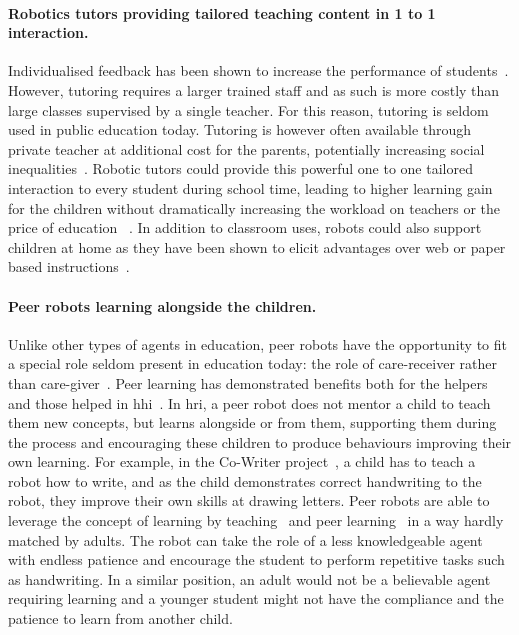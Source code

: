 \paragraph{Robotics tutors providing tailored teaching content in 1 to 1 interaction.} 
Individualised feedback has been shown to increase the performance of students~\citep{cohen1982educational,bloom19842}. However, tutoring requires a larger trained staff and as such is more costly than large classes supervised by a single teacher. For this reason, tutoring is seldom used in public education today. Tutoring is however often available through private teacher at additional cost for the parents, potentially increasing social inequalities~\citep{bray2009confronting}. Robotic tutors could provide this powerful one to one tailored interaction to every student during school time, leading to higher learning gain for the children without dramatically increasing the workload on teachers or the price of education ~\citep{kanda2004interactive,leyzberg2012physical,kennedy2016social,gordon2016affective}. In addition to classroom uses, robots could also support children at home as they have been shown to elicit advantages over web or paper based instructions~\citep{han2005educational}. 

\paragraph{Peer robots learning alongside the children.}
Unlike other types of agents in education, peer robots have the opportunity to fit a special role seldom present in education today: the role of care-receiver rather than care-giver~\citep{tanaka2012children}. Peer learning has demonstrated benefits both for the helpers and those helped in \gls{hhi}~\citep{topping2005trends}. In \gls{hri}, a peer robot does not mentor a child to teach them new concepts, but learns alongside or from them, supporting them during the process and encouraging these children to produce behaviours improving their own learning. For example, in the Co-Writer project~\citep{hood2015children}, a child has to teach a robot how to write, and as the child demonstrates correct handwriting to the robot, they improve their own skills at drawing letters. Peer robots are able to leverage the concept of learning by teaching~\citep{frager1970learning} and peer learning~\citep{topping2005trends} in a way hardly matched by adults. The robot can take the role of a less knowledgeable agent with endless patience and encourage the student to perform repetitive tasks such as handwriting. In a similar position, an adult would not be a believable agent requiring learning and a younger student might not have the compliance and the patience to learn from another child.

